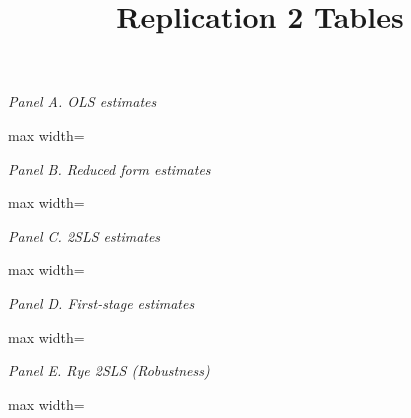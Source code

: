 \documentclass{article}
\title{Replication 2 Tables}
\begin{document}
\begin{table}[h]
\centering
\small
\textit{Panel A. OLS estimates}\\
\begin{adjustbox}{max width=\textwidth}
    
\end{adjustbox}

\vspace{1em}
\textit{Panel B. Reduced form estimates}\\
\begin{adjustbox}{max width=\textwidth}
    
\end{adjustbox}

\vspace{1em}
\textit{Panel C. 2SLS estimates}\\
\begin{adjustbox}{max width=\textwidth}
    
\end{adjustbox}

\vspace{1em}
\textit{Panel D. First-stage estimates}\\
\begin{adjustbox}{max width=\textwidth}
    
\end{adjustbox}

\vspace{1em}
\textit{Panel E. Rye 2SLS (Robustness)}\\
\begin{adjustbox}{max width=\textwidth}
    
\end{adjustbox}
\end{table}
\end{document}
